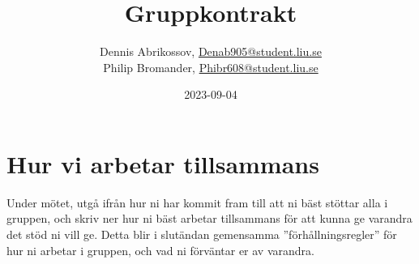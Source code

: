 \documentclass{liu_mall}
\author{Dennis Abrikossov, \url{Denab905@student.liu.se}\\
Philip Bromander, \url{Phibr608@student.liu.se}}
\title{Gruppkontrakt}
\date{2023-09-04}
\begin{document}
\projectpage





\section{Hur vi arbetar tillsammans}


Under mötet, utgå ifrån hur ni har kommit fram till att ni bäst stöttar alla i gruppen, och skriv ner hur ni bäst arbetar tillsammans för att kunna ge varandra det stöd ni
vill ge. Detta blir i slutändan gemensamma ''förhållningsregler'' för hur ni arbetar i gruppen, och
vad ni förväntar er av varandra.
\end{document}
